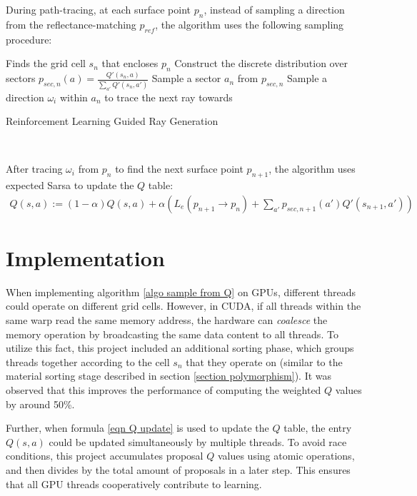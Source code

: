 During path-tracing, at each surface point $p_n$, instead of sampling a direction from the reflectance-matching $p_{ref}$, the algorithm uses the following sampling procedure:

\begin{algorithm}[H]
    \label{algo sample from Q}
    Finds the grid cell $s_n$ that encloses $p_n$\;
    Construct the discrete distribution over sectors $p_{sec,n}(a)=\frac{Q'(s_n,a)}{\sum_{a'}Q'(s_n,a')}$\;
    Sample a sector $a_n$ from $p_{sec,n}$\;
    Sample a direction $\omega_i$ within $a_n$ to trace the next ray towards\;
    \caption{Reinforcement Learning Guided Ray Generation}
\end{algorithm} 

~

After tracing $\omega_i$ from $p_n$ to find the next surface point $p_{n+1}$, the algorithm uses expected Sarsa to update the $Q$ table:
\begin{align}
    \label{eqn Q update}
    Q(s,a) := (1-\alpha) Q(s,a) + \alpha  \left(L_e(p_{n+1}\to p_n)+ \sum_{a'} p_{sec,n+1}(a')  Q'(s_{n+1},a')\right)
\end{align}

\section{Implementation}
When implementing algorithm \ref{algo sample from Q} on GPUs, different threads could operate on different grid cells. However, in CUDA, if all threads within the same warp read the same memory address, the hardware can \textit{coalesce} the memory operation by broadcasting the same data content to all threads. To utilize this fact, this project included an additional sorting phase, which groups threads together according to the cell $s_n$ that they operate on (similar to the material sorting stage described in section \ref{section polymorphism}). It was observed that this improves the performance of computing the weighted $Q$ values by around 50\%.

Further, when formula \ref{eqn Q update} is used to update the $Q$ table, the entry $Q(s,a)$ could be updated simultaneously by multiple threads. To avoid race conditions, this project accumulates proposal $Q$ values using atomic operations, and then divides by the total amount of proposals in a later step. This ensures that all GPU threads cooperatively contribute to learning. 

